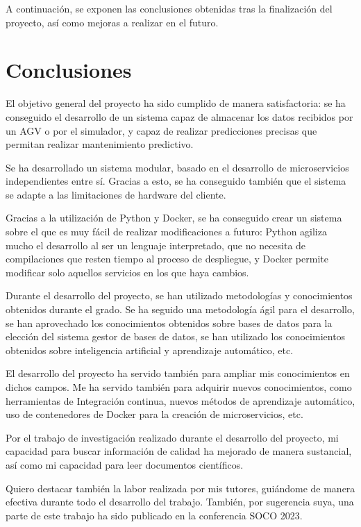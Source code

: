 
A continuación, se exponen las conclusiones obtenidas tras la finalización del proyecto, así como mejoras a realizar 
en el futuro.

\section{Conclusiones}

El objetivo general del proyecto ha sido cumplido de manera satisfactoria: se ha conseguido el desarrollo de un sistema
capaz de almacenar los datos recibidos por un AGV o por el simulador, y capaz de realizar predicciones precisas que permitan 
realizar mantenimiento predictivo.

Se ha desarrollado un sistema modular, basado en el desarrollo de microservicios independientes entre sí. Gracias a
esto, se ha conseguido también que el sistema se adapte a las limitaciones de hardware del cliente.

Gracias a la utilización de Python y Docker, se ha conseguido crear un sistema sobre el que es muy fácil de realizar 
modificaciones a futuro: Python agiliza mucho el desarrollo al ser un lenguaje interpretado, que no necesita de compilaciones 
que resten tiempo al proceso de despliegue, y Docker permite modificar solo aquellos servicios en los que haya cambios.

Durante el desarrollo del proyecto, se han utilizado metodologías y conocimientos obtenidos durante el grado. Se 
ha seguido una metodología ágil para el desarrollo, se han aprovechado los conocimientos obtenidos sobre bases de 
datos para la elección del sistema gestor de bases de datos, se han utilizado los conocimientos obtenidos sobre 
inteligencia artificial y aprendizaje automático, etc.

El desarrollo del proyecto ha servido también para ampliar mis conocimientos en dichos campos. Me ha servido 
también para adquirir nuevos conocimientos, como herramientas de Integración continua, nuevos métodos de aprendizaje 
automático, uso de contenedores de Docker para la creación de microservicios, etc.

Por el trabajo de investigación realizado durante el desarrollo del proyecto, mi capacidad para buscar información 
de calidad ha mejorado de manera sustancial, así como mi capacidad para leer documentos científicos.

Quiero destacar también la labor realizada por mis tutores, guiándome de manera efectiva durante todo el desarrollo del 
trabajo. También, por sugerencia suya, una parte de este trabajo ha sido publicado en la conferencia SOCO 2023.


